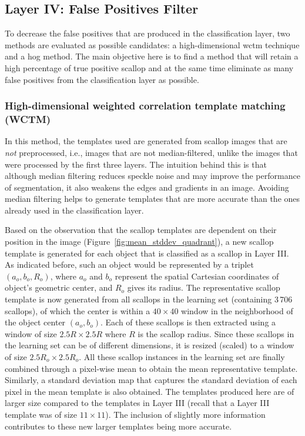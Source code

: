 \documentclass {udthesis}
\begin{document}
\subsection{Layer IV: False Positives Filter}

To decrease the false positives that are produced in the classification layer, two methods are evaluated as possible candidates: a high-dimensional \gls{wctm} technique and a \gls{hog} method. 
The main objective here is to find a method that will retain a high percentage of true positive scallop and at the same time eliminate as many false positives from the classification layer as possible.

\subsubsection{High-dimensional weighted correlation template matching (WCTM)}
In this method, the templates used are generated from scallop images that are \emph{not} preprocessed, i.e., images that are not median-filtered, unlike the images that were processed by the first three layers. 
The intuition behind this is that although median filtering reduces speckle noise and may improve the performance of segmentation, it also weakens the edges and gradients in an image. 
Avoiding median filtering helps to generate templates that are more accurate than the ones already used in the classification layer.

Based on the observation that the scallop templates are dependent on their position in the image (Figure~\ref{fig:mean_stddev_quadrant}), a new scallop template is generated for each object that is classified as a scallop in Layer III. 
As indicated before, such an object would be represented by a triplet $(a_o,b_o,R_o)$, where $a_o$ and $b_o$ represent the spatial Cartesian coordinates of object's geometric center, and $R_o$ gives its radius. 
The representative scallop template is now generated from all scallops in the learning set (containing 3\,706 scallops), of which the center is within a $40\times40$ window in the neighborhood of the object center $(a_o,b_o)$. 
Each of these scallops is then extracted using a window of size $2.5R\times2.5R$ where $R$ is the scallop radius. 
Since these scallops in the learning set can be of different dimensions, it is resized (scaled) to a window of size $2.5R_o\times2.5R_o$. 
All these scallop instances in the learning set are finally combined through a pixel-wise mean to obtain the mean representative template. 
Similarly, a standard deviation map that captures the standard deviation of each pixel in the mean template is also obtained.  
The templates produced here are of larger size compared to the templates in Layer III (recall that a Layer III template was of size $11\times11$).
The inclusion of slightly more information contributes to these new larger templates being more accurate.
\end{document}

